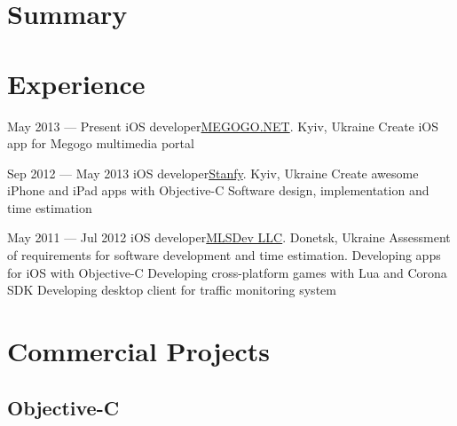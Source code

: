 \documentclass[11pt,a4paper,sans]{moderncv}
\begin{document}
\makecvtitle

\section{Summary}

\section{Experience}
  \cventry
    {May 2013 — Present}
    {iOS developer}{\href{http://megogo.net}{MEGOGO.NET}. Kyiv, Ukraine}{}{}{
      Create iOS app for Megogo multimedia portal}

  \cventry
    {Sep 2012 — May 2013}
    {iOS developer}{\href{http://mlsdev.com}{Stanfy}. Kyiv, Ukraine}{}{}{
      Create awesome iPhone and iPad apps with Objective-C
      \newline Software design, implementation and time estimation}

  \cventry
    {May 2011 — Jul 2012}
    {iOS developer}{\href{http://mlsdev.com}{MLSDev LLC}. Donetsk, Ukraine}{}{}{
      Assessment of requirements for software development and time estimation. 
      \newline Developing apps for iOS with Objective-C
      \newline Developing cross-platform games with Lua and Corona SDK
      \newline Developing desktop client for traffic monitoring system}

\section{Commercial Projects}
  \subsection{Objective-C}
\end{document}

